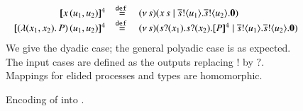\begin{figure}[t]
\[\begin{array}{rcl}
	\map{\appl{x}{(u_1, u_2)}}^{4} &\defeq& \newsp{s}{\appl{x}{s} \Par \bout{\dual{s}}{u_1}   \bout{\dual{s}}{u_2} \inact}
	\\
	\map{\appl{(\abs{(x_1,x_2)}{P})}{(u_1, u_2)}}^{4} &\defeq&
	\newsp{s}{\binp{s}{x_1}  \binp{s}{x_2} \pmap{P}{4} \Par \bout{\dual{s}}{u_1}  \bout{\dual{s}}{u_2} \inact} 
\end{array}
\]
We give the dyadic case;
the general polyadic case is as expected.
The input cases are defined as the outputs replacing $!$ by $?$. 
Mappings for elided processes and types are 
homomorphic.

\caption{\label{f:enc:poltomon}Encoding of \PHOp into \HOp. }
\end{figure}

